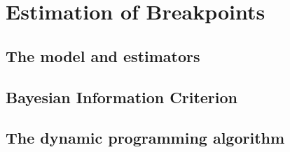 \section{Estimation of Breakpoints}
\label{sec:estimation_of_breakpoints}
\subsection{The model and estimators}
\label{subsec:the_model_and_estimators}
\subsection{Bayesian Information Criterion}
\label{subsec:bayesian_information_criterion}
\subsection{The dynamic programming algorithm}
\label{subsec:the_dynamic_programming_algorithm}
